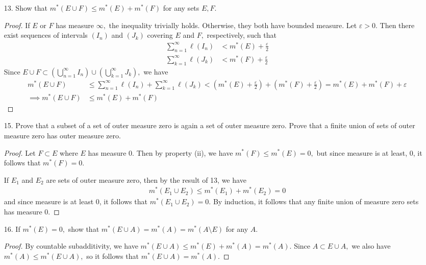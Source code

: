 \documentclass{article}
\begin{document}
\begin{itemize}
		\newpage
	\item[13.] Show that $m^*(E\cup F)\le m^*(E) + m^*(F)$ for any sets $E, F.$
		\begin{proof}
			If $E$ or $F$ has measure $\infty,$ the inequality trivially holds. Otherwise, they both have bounded measure. Let $\varepsilon>0.$ Then there exist sequences of intervals $(I_n)$ and $(J_k)$ covering $E$ and $F,$ respectively, such that
			\begin{align*}
				\sum_{n=1}^{\infty} \ell(I_n) &< m^*(E) + \frac{\varepsilon}{2} \\
				\sum_{k=1}^{\infty} \ell(J_k) &< m^*(F) + \frac{\varepsilon}{2}
			\end{align*}
			Since $E\cup F\subset \left( \bigcup_{n=1}^\infty I_n \right) \cup \left( \bigcup_{k=1}^\infty J_k \right),$ we have
			\begin{align*}
				m^*(E\cup F) &\le \sum_{n=1}^{\infty} \ell(I_n) + \sum_{k=1}^{\infty} \ell(J_k) < \left( m^*(E) + \frac{\varepsilon}{2} \right) + \left( m^*(F) + \frac{\varepsilon}{2} \right) = m^*(E) + m^*(F) + \varepsilon \\
				\implies m^*(E\cup F) &\le m^*(E) + m^*(F)	
			\end{align*}
		\end{proof}

	\item[15.] Prove that a subset of a set of outer measure zero is again a set of outer measure zero. Prove that a finite union of sets of outer measure zero has outer measure zero.
		\begin{proof}
			Let $F\subset E$ where $E$ has measure 0. Then by property (ii), we have $m^*(F)\le m^*(E)=0,$ but since measure is at least, 0, it follows that $m^*(F)=0.$

			If $E_1$ and $E_2$ are sets of outer measure zero, then by the result of 13, we have
			\begin{align*}
				m^*(E_1\cup E_2) \le m^*(E_1) + m^*(E_2) = 0
			\end{align*}
			and since measure is at least 0, it follows that $m^*(E_1\cup E_2)=0.$ By induction, it follows that any finite union of measure zero sets has measure 0.
		\end{proof}

	\item[16.] If $m^*(E)=0,$ show that $m^*(E\cup A)=m^*(A)=m^*(A\setminus E)$ for any $A.$
		\begin{proof}
			By countable subadditivity, we have $m^*(E\cup A) \le m^*(E) + m^*(A) = m^*(A).$ Since $A\subset E\cup A,$ we also have $m^*(A)\le m^*(E\cup A),$ so it follows that $m^*(E\cup A) = m^*(A).$


\end{proof}
\end{itemize}
\end{document}
